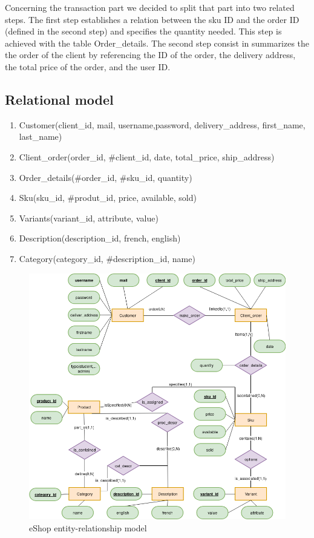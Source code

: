 \documentclass{article}
\begin{document}
Concerning the transaction part we decided to split that part into two related steps. The first step establishes a relation between the sku ID and the order ID (defined in the second step) and specifies the quantity needed. This step is achieved with the table Order\_details. The second step consist in summarizes the the order of the client by referencing the ID of the order, the delivery address, the total price of the order, and  the user ID.

\subsection{Relational model}
\begin{enumerate}
\item Customer(client\_id, mail, username,password, delivery\_address, first\_name, last\_name)

\item Client\_order(order\_id, \#client\_id, date, total\_price, ship\_address)

\item Order\_details(\#order\_id, \#sku\_id, quantity)

\item Sku(sku\_id, \#produt\_id, price, available, sold)

\item Variants(variant\_id, attribute, value)

\item Description(description\_id,  french,  english)

\item Category(category\_id, \#description\_id, name)
\end{enumerate}

\begin{figure}[h!]
    \centering
    \includegraphics[scale=0.4]{./images/ecommerce_ER.png}
    \caption{eShop entity-relationship model}
    \label{ecommerce_er}
\end{figure}
\end{document}
